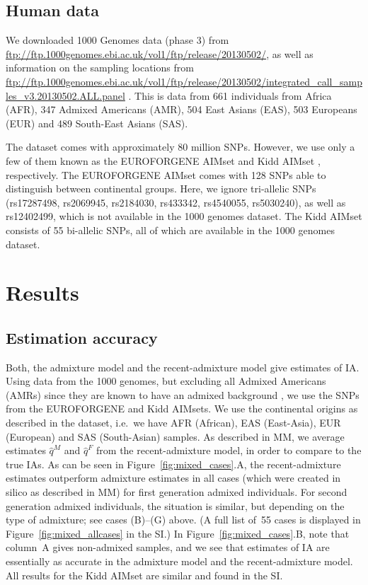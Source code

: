 \documentclass[12pt]{article}
\theoremstyle{definition}
\begin{document}
\subsection{Human data}
\sloppy We downloaded 1000 Genomes data (phase 3) from
\url{ftp://ftp.1000genomes.ebi.ac.uk/vol1/ftp/release/20130502/}, as
well as information on the sampling locations from
\url{ftp://ftp.1000genomes.ebi.ac.uk/vol1/ftp/release/20130502/integrated_call_samples_v3.20130502.ALL.panel}
\cite{Auton2015}. This is data from 661 individuals from Africa (AFR),
347 Admixed Americans (AMR), 504 East Asians (EAS), 503 Europeans
(EUR) and 489 South-East Asians (SAS).


The dataset comes with approximately 80 million SNPs.  However, we use
only a few of them known as the EUROFORGENE AIMset \cite{Phillips2014}
and Kidd AIMset \cite{Kidd2014}, respectively. The EUROFORGENE AIMset
comes with 128 SNPs able to distinguish between continental
groups. Here, we ignore tri-allelic SNPs (rs17287498, rs2069945,
rs2184030, rs433342, rs4540055, rs5030240), as well as rs12402499,
which is not available in the 1000 genomes dataset. The Kidd AIMset
consists of 55 bi-allelic SNPs, all of which are available in the 1000
genomes dataset.

\section{Results}

\subsection{Estimation accuracy}
Both, the admixture model and the recent-admixture model give
estimates of IA. Using data from the 1000 genomes, but excluding all
Admixed Americans (AMRs) since they are known to have an admixed
background \cite{Eduardoff2016, Pfaffelhuber2019}, we use the SNPs
from the EUROFORGENE and Kidd AIMsets. We use the continental origins
as described in the dataset, i.e.\ we have AFR (African), EAS
(East-Asia), EUR (European) and SAS (South-Asian) samples. As
described in MM, we average estimates $\hat q^M$ and $\hat q^F$ from
the recent-admixture model, in order to compare to the true IAs. As
can be seen in Figure~\ref{fig:mixed_cases}.A, the recent-admixture
estimates outperform admixture estimates in all cases (which were
created in silico as described in MM) for first generation admixed
individuals. For second generation admixed individuals, the situation
is similar, but depending on the type of admixture; see cases (B)--(G)
above. (A full list of~55 cases is displayed in
Figure~\ref{fig:mixed_allcases} in the SI.) In
Figure~\ref{fig:mixed_cases}.B, note that column~A gives non-admixed
samples, and we see that estimates of IA are essentially as accurate
in the admixture model and the recent-admixture model. All results for
the Kidd AIMset are similar and found in the SI.
\end{document}
